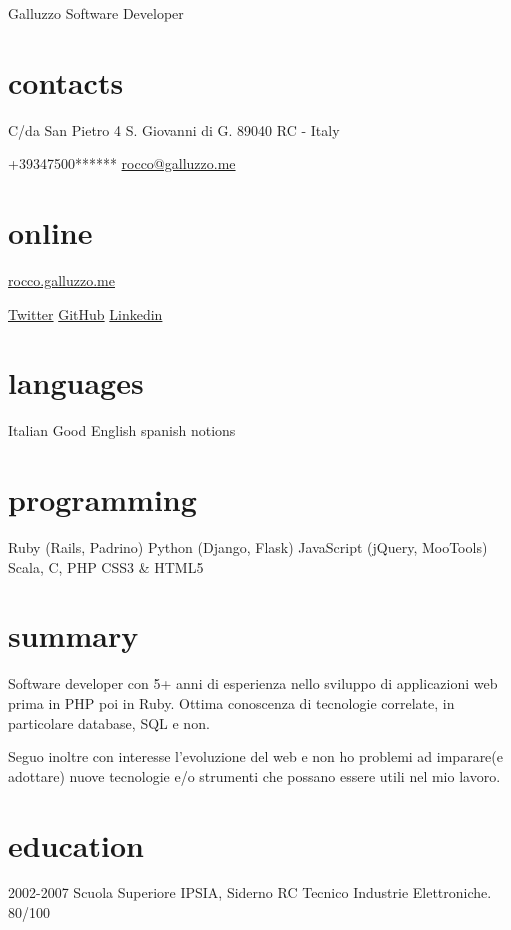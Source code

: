 \documentclass[print]{cv}
\begin{document}
 { Galluzzo}
       {Software Developer}

\begin{aside}%
\section{contacts}
    C/da San Pietro 4
    S. Giovanni di G.
89040 RC - Italy\par\smallskip%
+39347500******
  \href{mailto:rocco@galluzzo.me}{rocco@galluzzo.me}
  \section{online}
  \href{http://rocco.galluzzo.me}{rocco.galluzzo.me}
         \par\smallskip%
  \href{http://twitter.com/byterussian}{Twitter}
           \href{https://github.com/byterussian}{GitHub}
           \href{http://www.linkedin.com/in/roccogalluzzo}{Linkedin}
  \section{languages}
    Italian
    Good English
    spanish notions
  \section{programming}
    Ruby
    (Rails, Padrino)
    Python
    (Django, Flask)
    JavaScript
    (jQuery, MooTools)
    Scala, C, PHP
    CSS3 \& HTML5
\end{aside}

\section{summary}
Software developer con 5+ anni di esperienza nello sviluppo di applicazioni web
prima in PHP poi in Ruby. Ottima conoscenza di tecnologie correlate, in particolare
database, SQL e non.

Seguo inoltre con interesse l'evoluzione del web e non ho problemi ad imparare(e adottare)
nuove tecnologie e/o strumenti che possano essere utili nel mio lavoro.
\section{education}

\begin{entrylist}

  \entry
    {2002-2007}
    {Scuola Superiore}
    {IPSIA, Siderno RC}
    {Tecnico Industrie Elettroniche. 80/100}

\end{entrylist}
\end{document}
